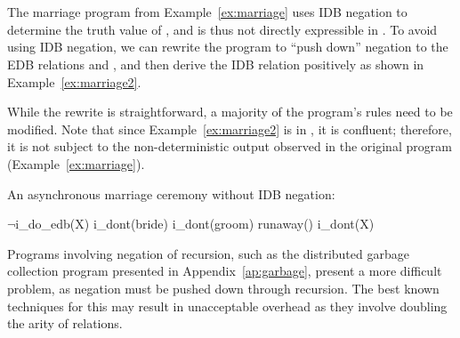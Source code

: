 \section{{\large \bf \plang}}
\label{sec:perfect}

The marriage program from
Example~\ref{ex:marriage} uses IDB negation to determine the truth value of
, and is thus not directly expressible in \slang. To avoid using IDB negation, we can rewrite the program to
``push down'' negation to the EDB relations  and
, and then derive the  IDB relation
positively as shown in Example~\ref{ex:marriage2}.  

While the rewrite is
straightforward, a majority of the program's rules need to be modified.
Note that since Example~\ref{ex:marriage2} is in \slang, it is
confluent; therefore, it is not subject to the non-deterministic output observed in the original program (Example~\ref{ex:marriage}).

\begin{example}
\label{ex:marriage2}
An asynchronous marriage ceremony without IDB negation:

\begin{Drules}
        {$\lnot$i_do_edb(X)}
          {i_dont(bride)}
          {i_dont(groom)}
        {runaway()}
        {i_dont(X)}
\end{Drules}
\end{example}

Programs involving negation of recursion, such as the distributed garbage collection program presented in Appendix~\ref{ap:garbage}, present a more difficult problem, as negation must be pushed down through recursion.  The best known techniques for this may result in unacceptable overhead as they involve doubling the arity of relations.

